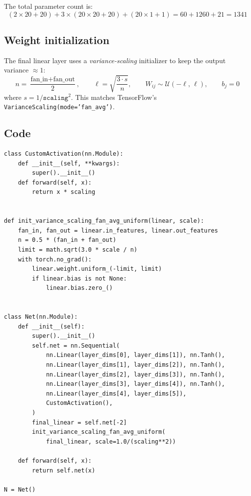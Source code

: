 \documentclass[11pt,a4paper]{article}
\begin{document}
The total parameter count is:
\[
  (2 \times 20 + 20) + 3 \times (20 \times 20 + 20) + (20 \times 1 + 1)
  = 60 + 1260 + 21 = 1341
\]

\subsection*{Weight initialization}

The final linear layer uses a \emph{variance-scaling} initializer to keep
the output variance $\approx 1$:
\begin{equation}
  n = \frac{\text{fan\_in} + \text{fan\_out}}{2}, \qquad
  \ell = \sqrt{\frac{3 \cdot s}{n}}, \qquad
  W_{ij} \sim \mathcal{U}(-\ell,\, \ell), \qquad
  b_j = 0
\label{eq:init}
\end{equation}
where $s = 1/\texttt{scaling}^2$.  This matches TensorFlow's
\texttt{VarianceScaling(mode='fan\_avg')}.

\subsection*{Code}

\begin{lstlisting}
class CustomActivation(nn.Module):
    def __init__(self, **kwargs):
        super().__init__()
    def forward(self, x):
        return x * scaling


def init_variance_scaling_fan_avg_uniform(linear, scale):
    fan_in, fan_out = linear.in_features, linear.out_features
    n = 0.5 * (fan_in + fan_out)
    limit = math.sqrt(3.0 * scale / n)
    with torch.no_grad():
        linear.weight.uniform_(-limit, limit)
        if linear.bias is not None:
            linear.bias.zero_()


class Net(nn.Module):
    def __init__(self):
        super().__init__()
        self.net = nn.Sequential(
            nn.Linear(layer_dims[0], layer_dims[1]), nn.Tanh(),
            nn.Linear(layer_dims[1], layer_dims[2]), nn.Tanh(),
            nn.Linear(layer_dims[2], layer_dims[3]), nn.Tanh(),
            nn.Linear(layer_dims[3], layer_dims[4]), nn.Tanh(),
            nn.Linear(layer_dims[4], layer_dims[5]),
            CustomActivation(),
        )
        final_linear = self.net[-2]
        init_variance_scaling_fan_avg_uniform(
            final_linear, scale=1.0/(scaling**2))

    def forward(self, x):
        return self.net(x)

N = Net()
\end{lstlisting}
\end{document}
